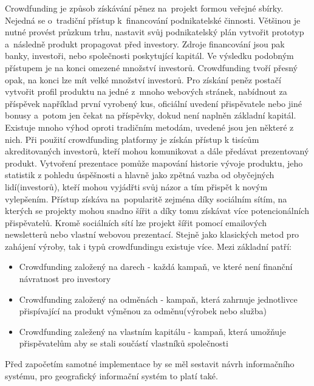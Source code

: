 \documentclass[12pt]{article}%
\begin{document}
{{%

Crowdfunding je způsob získávání pěnez na~projekt formou veřejné sbírky. Nejedná se o~tradiční 
přístup k~financování podnikatelské činnosti. Většinou je nutné provést průzkum trhu, nastavit 
svůj podnikatelský plán vytvořit prototyp a~následně produkt propagovat před investory. Zdroje 
financování jsou pak banky, investoři, nebo společnosti poskytující kapitál. Ve výsledku podobným 
přístupem je na konci omezené množství investorů. Crowdfunding tvoří přesný opak, na konci lze mít 
velké množství investorů. Pro získání peněz postačí vytvořit profil produktu na jedné z~mnoho 
webových stránek, nabídnout za příspěvek například první vyrobený kus, oficiální uvedení 
přispěvatele nebo jiné bonusy a~potom jen čekat na příspěvky, dokud není naplněn základní kapitál.
Existuje mnoho výhod oproti tradičním metodám, uvedené jsou jen některé z nich. Při použití 
crowdfunding platformy je získán přístup k tisícům akreditovaných investorů, kteří mohou 
komunikovat a dále předávat prezentovaný produkt. Vytvoření prezentace pomůže mapování historie 
vývoje produktu, jeho statistik z pohledu úspěšnosti a hlavně jako zpětná vazba od obyčejných 
lidí(investorů), kteří mohou vyjádřti svůj názor a tím přispět k novým vylepšením. Přístup 
získáva na~popularitě zejména díky sociálním sítím, na kterých se projekty mohou snadno šířit 
a díky tomu získávat více potencionálních přispěvatelů. Kromě sociálních sítí lze projekt šířit 
pomocí emailových newsletterů nebo vlastní webovou prezentací. 
Stejně jako klasických metod pro zahájení výroby, tak i typů crowdfundingu existuje více. Mezi 
základní patří:
\begin{itemize}
\item Crowdfunding založený na darech - každá kampaň, ve které není finanční návratnost pro 
investory
\item Crowdfunding založený na odměnách - kampaň, která zahrnuje jednotlivce přispívající 
na produkt výměnou za odměnu(výrobek nebo služba)
\item Crowdfunding zaležený na vlastním kapitálu - kampaň, která umožňuje přispěvatelům aby 
se stali součástí vlastníků společnosti
\end{itemize}

Před započetím samotné implementace by se měl sestavit návrh informačního systému, pro geografický 
informační systém to platí také.

}}
\end{document}
